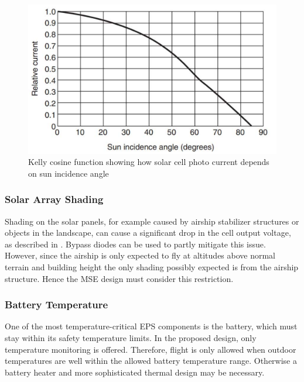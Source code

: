 \begin{figure}[H]
\centering
\includegraphics[scale=0.4]{figures/fig_KellyCosine}
\caption[Kelly cosine function]{Kelly cosine function showing how solar cell photo current depends on sun incidence angle \cite[Fig 9.12]{book:mukund_wind}}
\label{fig:KellyCosine}
\end{figure}
%
%
\subsubsection*{Solar Array Shading}
Shading on the solar panels, for example caused by airship stabilizer structures or objects in the landscape, can cause a significant drop in the cell output voltage, as described in \cite[p. 165]{Mukund}. Bypass diodes can be used to partly mitigate this issue. However, since the airship is only expected to fly at altitudes above normal terrain and building height the only shading possibly expected is from the airship structure. Hence the \ac{MSE} design must consider this restriction.
%
\subsubsection*{Battery Temperature}
One of the most temperature-critical \ac{EPS} components is the battery, which must stay within its safety temperature limits. In the proposed design, only temperature monitoring is offered. Therefore, flight is only allowed when outdoor temperatures are well within the allowed battery temperature range. Otherwise a battery heater and more sophisticated thermal design may be necessary.
%
